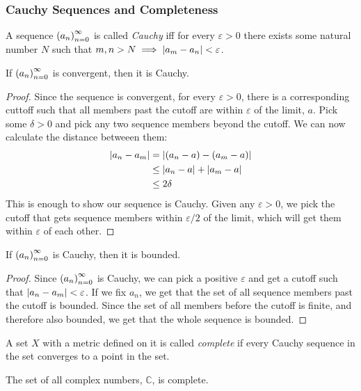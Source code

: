 \subsubsection{Cauchy Sequences and Completeness}
\begin{definition}
A sequence $\seq{a}$ is called \emph{Cauchy} iff for every $\varepsilon > 0$ there exists some natural number $N$ such that $m, n > N \implies \left\lvert a_m-a_n \right\rvert < \varepsilon$.
\end{definition}
\begin{lemma}
If $\seq{a}$ is convergent, then it is Cauchy.
\end{lemma}
\begin{proof}
Since the sequence is convergent, for every $\varepsilon > 0$, there is a corresponding cuttoff such that all members past the cutoff are within $\varepsilon$ of the limit, $a$. Pick some $\delta > 0$ and pick any two sequence members beyond the cutoff. We can now calculate the distance betweeen them:
\begin{align*}
\left\lvert a_n-a_m \right\rvert &= \left\lvert (a_n -a) - (a_m-a) \right\rvert\\
&\leq \left\lvert a_n - a \right\rvert + \left\lvert a_m - a \right\rvert\\
&\leq 2\delta
\end{align*}
This is enough to show our sequence is Cauchy. Given any $\varepsilon > 0$, we pick the cutoff that gets sequence members within $\varepsilon/2$ of the limit, which will get them within $\varepsilon$ of each other.
\end{proof}
\begin{lemma}
If $\seq{a}$ is Cauchy, then it is bounded.
\end{lemma}
\begin{proof}
Since $\seq{a}$ is Cauchy, we can pick a positive $\varepsilon$ and get a cutoff such that $\left\lvert a_n-a_m \right\rvert < \varepsilon$. If we fix $a_n$, we get that the set of all sequence members past the cutoff is bounded. Since the set of all members before the cutoff is finite, and therefore also bounded, we get that the whole sequence is bounded.
\end{proof}
\begin{definition}[Completeness]
A set $X$ with a metric defined on it is called \emph{complete} if every Cauchy sequence in the set converges to a point in the set.
\end{definition}
\begin{theorem}
The set of all complex numbers,  $\mathbb{C}$, is complete.
\end{theorem}
